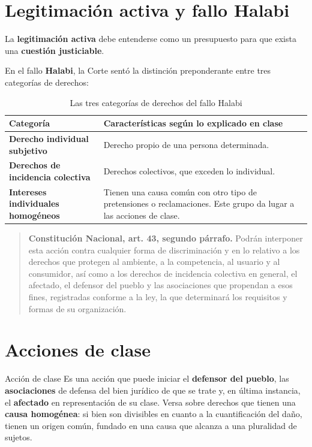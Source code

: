 \documentclass[12pt,oneside]{book}
\begin{document}
\section{Legitimación activa y fallo Halabi}

La \textbf{legitimación activa} debe entenderse como un presupuesto para que exista una \textbf{cuestión justiciable}.

En el fallo \textbf{Halabi}, la Corte sentó la distinción preponderante entre tres categorías de derechos:

\begin{table}[H]
\centering
\renewcommand{\arraystretch}{1.3}
\begin{tabularx}{\textwidth}{
    >{\raggedright\arraybackslash}p{}
    >{\raggedright\arraybackslash}X
}
\toprule
\textbf{Categoría} & \textbf{Características según lo explicado en clase} \\
\midrule
\textbf{Derecho individual subjetivo} & Derecho propio de una persona determinada. \\
\textbf{Derechos de incidencia colectiva} & Derechos colectivos, que exceden lo individual. \\
\textbf{Intereses individuales homogéneos} & Tienen una causa común con otro tipo de pretensiones o reclamaciones. Este grupo da lugar a las acciones de clase. \\
\bottomrule
\end{tabularx}
\caption{Las tres categorías de derechos del fallo Halabi}
\end{table}

\begin{quote}
\textbf{Constitución Nacional, art. 43, segundo párrafo.} Podrán interponer esta acción contra cualquier forma de discriminación y en lo relativo a los derechos que protegen al ambiente, a la competencia, al usuario y al consumidor, así como a los derechos de incidencia colectiva en general, el afectado, el defensor del pueblo y las asociaciones que propendan a esos fines, registradas conforme a la ley, la que determinará los requisitos y formas de su organización.
\end{quote}

\section{Acciones de clase}

\begin{definition}{Acción de clase}
Es una acción que puede iniciar el \textbf{defensor del pueblo}, las \textbf{asociaciones} de defensa del bien jurídico de que se trate y, en última instancia, el \textbf{afectado} en representación de su clase. Versa sobre derechos que tienen una \textbf{causa homogénea}: si bien son divisibles en cuanto a la cuantificación del daño, tienen un origen común, fundado en una causa que alcanza a una pluralidad de sujetos.
\end{definition}
\end{document}
